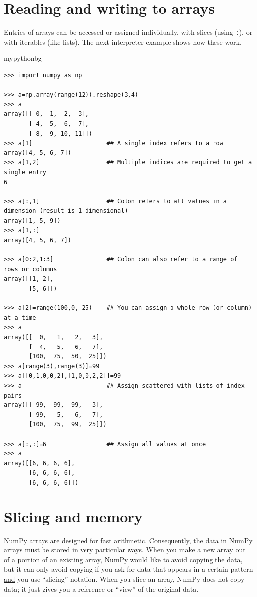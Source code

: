 \section{Reading and writing to arrays}
Entries of arrays can be accessed or assigned individually,
with slices (using \texttt{:}),
or with iterables (like lists).
The next interpreter example shows how these work.
\begin{tsession}{mypythonbg}
\begin{verbatim}
>>> import numpy as np

>>> a=np.array(range(12)).reshape(3,4)
>>> a
array([[ 0,  1,  2,  3],
       [ 4,  5,  6,  7],
       [ 8,  9, 10, 11]])
>>> a[1]                     ## A single index refers to a row
array([4, 5, 6, 7])
>>> a[1,2]                   ## Multiple indices are required to get a single entry
6

>>> a[:,1]                   ## Colon refers to all values in a dimension (result is 1-dimensional)
array([1, 5, 9])
>>> a[1,:]
array([4, 5, 6, 7])

>>> a[0:2,1:3]               ## Colon can also refer to a range of rows or columns
array([[1, 2],
       [5, 6]])

>>> a[2]=range(100,0,-25)    ## You can assign a whole row (or column) at a time
>>> a
array([[  0,   1,   2,   3],
       [  4,   5,   6,   7],
       [100,  75,  50,  25]])
>>> a[range(3),range(3)]=99 
>>> a[[0,1,0,0,2],[1,0,0,2,2]]=99
>>> a                        ## Assign scattered with lists of index pairs
array([[ 99,  99,  99,   3],
       [ 99,   5,   6,   7],
       [100,  75,  99,  25]])

>>> a[:,:]=6                 ## Assign all values at once
>>> a
array([[6, 6, 6, 6],
       [6, 6, 6, 6],
       [6, 6, 6, 6]])
\end{verbatim}
\end{tsession}

\section{Slicing and memory}
NumPy arrays are designed for fast arithmetic.
Consequently, the data in NumPy arrays must be stored in very particular ways.
When you make a new array out of a portion of an existing array,
NumPy would like to avoid copying the data,
but it can only avoid copying if you ask for data that appears in a certain pattern
\underline{and} you use ``slicing'' notation.
When you slice an array, NumPy does not copy data;
it just gives you a reference or ``view'' of the original data.

